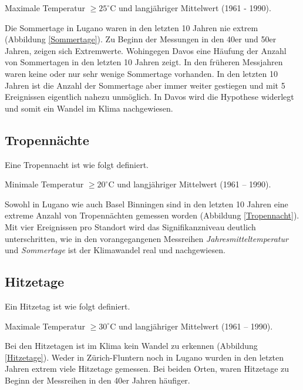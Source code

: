 \begin{refsection}
\begin{definition}
Maximale Temperatur $\ge 25^{\circ}$C und langjähriger Mittelwert (1961 - 1990).
\end{definition}

Die Sommertage in Lugano waren in den letzten 10 Jahren nie extrem (Abbildung \ref{Sommertage}). Zu Beginn der Messungen in den 40er und 50er Jahren, zeigen sich Extremwerte. Wohingegen Davos eine Häufung der Anzahl von Sommertagen in den letzten 10 Jahren zeigt. In den früheren Messjahren waren keine oder nur sehr wenige Sommertage vorhanden. In den letzten 10 Jahren ist die Anzahl der Sommertage aber immer weiter gestiegen und mit 5 Ereignissen eigentlich nahezu unmöglich. In Davos wird die Hypothese widerlegt und somit ein Wandel im Klima nachgewiesen.


\subsection{Tropennächte}
Eine Tropennacht ist wie folgt definiert.

\begin{definition}
Minimale Temperatur $\ge 20^{\circ}$C und langjähriger Mittelwert (1961 -- 1990).
\end{definition}

Sowohl in Lugano wie auch Basel Binningen sind in den letzten 10 Jahren eine extreme Anzahl von Tropennächten gemessen worden (Abbildung \ref{Tropennacht}). Mit vier Ereignissen pro Standort wird das Signifikanzniveau deutlich unterschritten, wie in den vorangegangenen Messreihen \textit{Jahresmitteltemperatur} und \textit{Sommertage} ist der Klimawandel real und nachgewiesen.


\subsection{Hitzetage}

Ein Hitzetag ist wie folgt definiert.

\begin{definition}
Maximale Temperatur $\ge 30^{\circ}$C und langjähriger Mittelwert (1961 -- 1990).
\end{definition}

Bei den Hitzetagen ist im Klima kein Wandel zu erkennen (Abbildung \ref{Hitzetage}). Weder in Zürich-Fluntern noch in Lugano wurden in den letzten Jahren extrem viele Hitzetage gemessen. Bei beiden Orten, waren Hitzetage zu Beginn der Messreihen in den 40er Jahren häufiger.



\end{refsection}
